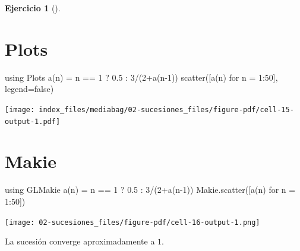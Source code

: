 \documentclass[
  a4paper,
]{scrreport}
\newenvironment{Shaded}{\begin{snugshade}}{\end{snugshade}}
\newcommand{\BuiltInTok}[1]{\textcolor[rgb]{0.00,0.23,0.31}{#1}}
\newcommand{\ConstantTok}[1]{\textcolor[rgb]{0.56,0.35,0.01}{#1}}
\newcommand{\FloatTok}[1]{\textcolor[rgb]{0.68,0.00,0.00}{#1}}
\newcommand{\FunctionTok}[1]{\textcolor[rgb]{0.28,0.35,0.67}{#1}}
\newcommand{\ImportTok}[1]{\textcolor[rgb]{0.00,0.46,0.62}{#1}}
\newcommand{\NormalTok}[1]{\textcolor[rgb]{0.00,0.23,0.31}{#1}}
\newcommand{\OperatorTok}[1]{\textcolor[rgb]{0.37,0.37,0.37}{#1}}
\theoremstyle{definition}
\newtheorem{exercise}{Ejercicio}[chapter]
\theoremstyle{remark}
\begin{document}
\begin{exercise}[]
\begin{enumerate}
\begin{tcolorbox}
  \section{Plots}

\begin{Shaded}
\begin{Highlighting}[]
\ImportTok{using} \BuiltInTok{Plots}
\FunctionTok{a}\NormalTok{(n) }\OperatorTok{=}\NormalTok{  n }\OperatorTok{==} \FloatTok{1}\NormalTok{ ? }\FloatTok{0.5} \OperatorTok{:} \FloatTok{3}\OperatorTok{/}\NormalTok{(}\FloatTok{2}\FunctionTok{+a}\NormalTok{(n}\OperatorTok{{-}}\FloatTok{1}\NormalTok{))}
\FunctionTok{scatter}\NormalTok{([}\FunctionTok{a}\NormalTok{(n) for n }\OperatorTok{=} \FloatTok{1}\OperatorTok{:}\FloatTok{50}\NormalTok{], legend}\OperatorTok{=}\ConstantTok{false}\NormalTok{)}
\end{Highlighting}
\end{Shaded}

  \texttt{[image: index\_files/mediabag/02-sucesiones\_files/figure-pdf/cell-15-output-1.pdf]}

  \section{Makie}

\begin{Shaded}
\begin{Highlighting}[]
\ImportTok{using} \BuiltInTok{GLMakie}
\FunctionTok{a}\NormalTok{(n) }\OperatorTok{=}\NormalTok{ n }\OperatorTok{==} \FloatTok{1}\NormalTok{ ? }\FloatTok{0.5} \OperatorTok{:} \FloatTok{3}\OperatorTok{/}\NormalTok{(}\FloatTok{2}\FunctionTok{+a}\NormalTok{(n}\OperatorTok{{-}}\FloatTok{1}\NormalTok{))}
\NormalTok{Makie.}\FunctionTok{scatter}\NormalTok{([}\FunctionTok{a}\NormalTok{(n) for n }\OperatorTok{=} \FloatTok{1}\OperatorTok{:}\FloatTok{50}\NormalTok{])}
\end{Highlighting}
\end{Shaded}

  \texttt{[image: 02-sucesiones\_files/figure-pdf/cell-16-output-1.png]}

  La sucesión converge aproximadamente a \(1\).

  \end{tcolorbox}
\end{enumerate}

\end{exercise}
\end{document}
